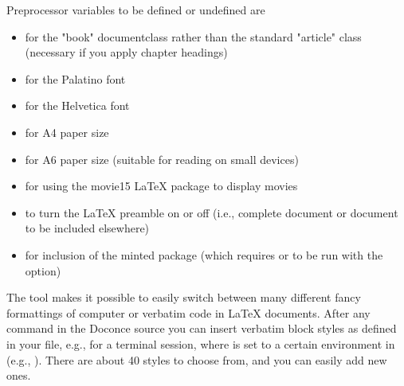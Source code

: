 \documentclass[twoside]{book}
\begin{document}
{{{{Preprocessor variables to be defined or undefined are

\begin{itemize}
 \item {} for the "book" documentclass rather than the standard
   "article" class (necessary if you apply chapter headings)

 \item {} for the Palatino font

 \item {} for the Helvetica font

 \item {} for A4 paper size

 \item {} for A6 paper size (suitable for reading on small devices)

 \item {} for using the movie15 {\LaTeX} package to display movies

 \item {} to turn the {\LaTeX} preamble on or off (i.e., complete document
   or document to be included elsewhere)

 \item {} for inclusion of the minted package (which requires 
   or  to be run with the  option)
\end{itemize}

\noindent
The  tool makes it possible to easily switch between many
different fancy formattings of computer or verbatim code in {\LaTeX}
documents. After any  command in the Doconce source you can
insert verbatim block styles as defined in your 
file, e.g.,  for a terminal session, where  is set to
a certain environment in  (e.g., ).
There are about 40 styles to choose from, and you can easily add
new ones.

}}}}
\end{document}
